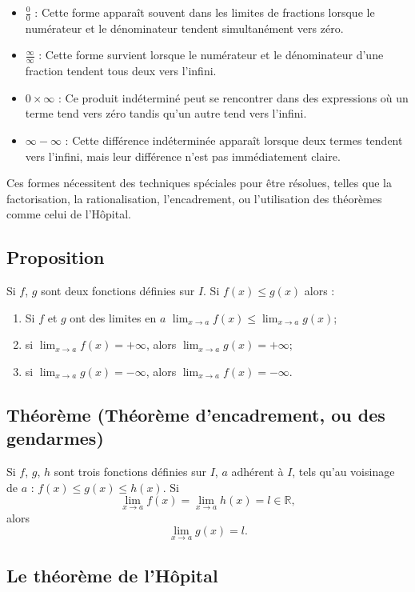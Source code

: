\documentclass{article}
\begin{document}
	\begin{itemize}
		\item $\frac{0}{0}$ : Cette forme apparaît souvent dans les limites de fractions lorsque le numérateur et le dénominateur tendent simultanément vers zéro.
		\item $\frac{\infty}{\infty}$ : Cette forme survient lorsque le numérateur et le dénominateur d'une fraction tendent tous deux vers l'infini.
		\item $0 \times \infty$ : Ce produit indéterminé peut se rencontrer dans des expressions où un terme tend vers zéro tandis qu'un autre tend vers l'infini.
		\item $\infty - \infty$ : Cette différence indéterminée apparaît lorsque deux termes tendent vers l'infini, mais leur différence n'est pas immédiatement claire.
	\end{itemize}
	
	Ces formes nécessitent des techniques spéciales pour être résolues, telles que la factorisation, la rationalisation, l'encadrement, ou l'utilisation des théorèmes comme celui de l'Hôpital.
	
	\subsection{Proposition }
	Si \( f \), \( g \) sont deux fonctions définies sur \( I \). Si \( f(x) \leq g(x) \) alors :
	

	\begin{enumerate}
		\item  	Si \( f \) et \( g \) ont des limites en \( a \)	\(\lim_{x \to a} f(x) \leq \lim_{x \to a} g(x) \);
		\item si \( \lim_{x \to a} f(x) = +\infty \), alors \( \lim_{x \to a} g(x) = +\infty \);
		\item si \( \lim_{x \to a} g(x) = -\infty \), alors \( \lim_{x \to a} f(x) = -\infty \).
	\end{enumerate}
	\subsection{Théorème  (Théorème d'encadrement, ou des gendarmes)}
	Si \( f \), \( g \), \( h \) sont trois fonctions définies sur \( I \), \( a \) adhérent à \( I \), tels qu'au voisinage de \( a \) : \( f(x) \leq g(x) \leq h(x) \). Si
	\[
	\lim_{x \to a} f(x) = \lim_{x \to a} h(x) = l \in \mathbb{R},
	\]
	alors
	\[
	\lim_{x \to a} g(x) = l.
	\]
	\subsection{Le théorème de l'Hôpital}
	
\end{document}
